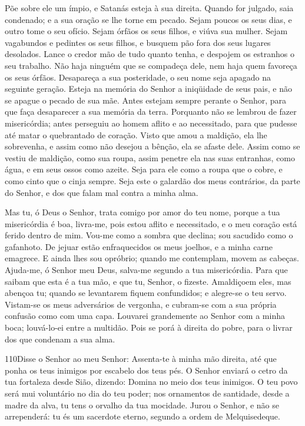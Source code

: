 Põe sobre ele um ímpio, e Satanás esteja à sua direita. Quando
for julgado, saia condenado; e a sua oração se lhe torne em pecado.
Sejam poucos os seus dias, e outro tome o seu ofício. Sejam
órfãos os seus filhos, e viúva sua mulher. Sejam vagabundos e
pedintes os seus filhos, e busquem pão fora dos seus lugares
desolados. Lance o credor mão de tudo quanto tenha, e
despojem os estranhos o seu trabalho. Não haja ninguém que se
compadeça dele, nem haja quem favoreça os seus órfãos.
Desapareça a sua posteridade, o seu nome seja apagado na
seguinte geração. Esteja na memória do Senhor a iniqüidade de
seus pais, e não se apague o pecado de sua mãe. Antes estejam
sempre perante o Senhor, para que faça desaparecer a sua memória da
terra. Porquanto não se lembrou de fazer misericórdia; antes
perseguiu ao homem aflito e ao necessitado, para que pudesse até
matar o quebrantado de coração. Visto que amou a maldição,
ela lhe sobrevenha, e assim como não desejou a bênção, ela se afaste
dele. Assim como se vestiu de maldição, como sua roupa, assim
penetre ela nas suas entranhas, como água, e em seus ossos como
azeite. Seja para ele como a roupa que o cobre, e como cinto
que o cinja sempre. Seja este o galardão dos meus contrários,
da parte do Senhor, e dos que falam mal contra a minha alma.

Mas tu, ó Deus o Senhor, trata comigo por amor do teu nome,
porque a tua misericórdia é boa, livra-me, pois estou aflito
e necessitado, e o meu coração está ferido dentro de mim.
Vou-me como a sombra que declina; sou sacudido como o
gafanhoto. De jejuar estão enfraquecidos os meus joelhos, e a
minha carne emagrece. E ainda lhes sou opróbrio; quando me
contemplam, movem as cabeças. Ajuda-me, ó Senhor meu Deus,
salva-me segundo a tua misericórdia. Para que saibam que esta
é a tua mão, e que tu, Senhor, o fizeste. Amaldiçoem eles,
mas abençoa tu; quando se levantarem fiquem confundidos; e alegre-se
o teu servo. Vistam-se os meus adversários de vergonha, e
cubram-se com a sua própria confusão como com uma capa.
Louvarei grandemente ao Senhor com a minha boca; louvá-lo-ei
entre a multidão. Pois se porá à direita do pobre, para o
livrar dos que condenam a sua alma.

\bigskip

\lettrine{110}{}Disse o Senhor ao meu Senhor: Assenta-te à
minha mão direita, até que ponha os teus inimigos por escabelo dos
teus pés. O Senhor enviará o cetro da tua fortaleza desde Sião,
dizendo: Domina no meio dos teus inimigos. O teu povo será mui
voluntário no dia do teu poder; nos ornamentos de santidade, desde a
madre da alva, tu tens o orvalho da tua mocidade. Jurou o
Senhor, e não se arrependerá: tu és um sacerdote eterno, segundo a
ordem de Melquisedeque.

